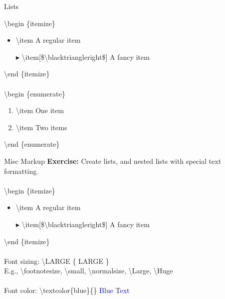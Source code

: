 \documentclass[xcolor=dvipsnames]{beamer}
\begin{document}
\begin{frame}{\LARGE{Lists}}

\textbackslash begin \{itemize\}\\


\begin{itemize}
\item \textbackslash item A regular item
\item[$\blacktriangleright$] \textbackslash item[\$\textbackslash blacktriangleright\$] A fancy item
\end{itemize}
\textbackslash end \{itemize\}~\\~\\

\textbackslash begin \{enumerate\}\\
\begin{enumerate}
\item \textbackslash item One item
\item \textbackslash item Two items
\end{enumerate}
\textbackslash end \{enumerate\}
\end{frame}

\begin{frame}{\LARGE{Misc Markup}}
\Large{\textbf{Exercise:} Create lists, and nested lists with special text formatting.}\\
\hrulefill ~\\
\normalsize
\textbackslash begin \{itemize\}\\
\begin{itemize}
\item \textbackslash item A regular item
\item[$\blacktriangleright$] \textbackslash item[\$\textbackslash blacktriangleright\$] A fancy item
\end{itemize}
\textbackslash end \{itemize\}~\\~\\

Font sizing: \textbackslash LARGE \{ \Large{LARGE} \normalsize \}\\
E.g., \textbackslash footnotesize, \textbackslash small, \textbackslash normalsize, \textbackslash Large, \textbackslash Huge \\~\\

Font color: \textbackslash textcolor\{blue\}\{\} \textcolor{blue}{Blue Text}
\end{frame}
\end{document}
